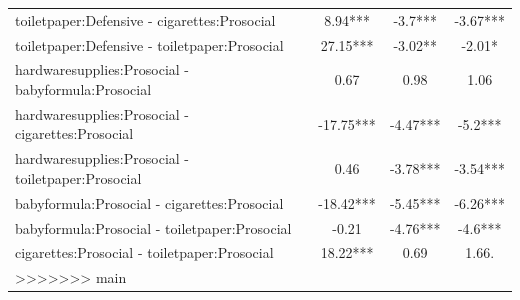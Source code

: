\documentclass[]{report}
\begin{document}
\begin{longtable}{lccc}
			toiletpaper:Defensive - cigarettes:Prosocial & 8.94*** & -3.7*** & -3.67*** \\ 
			toiletpaper:Defensive - toiletpaper:Prosocial & 27.15*** & -3.02** & -2.01* \\ 
			hardwaresupplies:Prosocial - babyformula:Prosocial & 0.67 & 0.98 & 1.06 \\ 
			hardwaresupplies:Prosocial - cigarettes:Prosocial & -17.75*** & -4.47*** & -5.2*** \\ 
			hardwaresupplies:Prosocial - toiletpaper:Prosocial & 0.46 & -3.78*** & -3.54*** \\ 
			babyformula:Prosocial - cigarettes:Prosocial & -18.42*** & -5.45*** & -6.26*** \\ 
			babyformula:Prosocial - toiletpaper:Prosocial & -0.21 & -4.76*** & -4.6*** \\ 
			cigarettes:Prosocial - toiletpaper:Prosocial & 18.22*** & 0.69 & 1.66. \\ 
>>>>>>> main
			\bottomrule
	
	\end{longtable}
	
\end{document}
